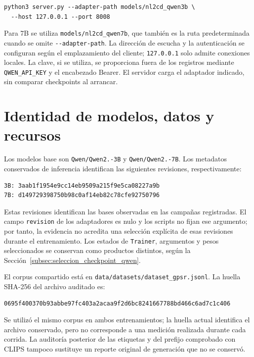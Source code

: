 {\small
\begin{verbatim}
python3 server.py --adapter-path models/nl2cd_qwen3b \
  --host 127.0.0.1 --port 8008
\end{verbatim}
}

Para 7B se utiliza \texttt{models/\allowbreak nl2cd\_\allowbreak qwen7b}, que también es la
ruta predeterminada cuando se omite \texttt{-\allowbreak -\allowbreak adapter-\allowbreak path}.
La dirección de escucha y la autenticación se configuran según el
emplazamiento del cliente; \texttt{127.0.0.1} solo admite conexiones
locales. La clave, si se utiliza, se proporciona fuera de los registros
mediante \texttt{QWEN\_API\_KEY} y el encabezado Bearer.
El servidor carga el adaptador indicado, sin comparar checkpoints al arrancar.



\section{Identidad de modelos, datos y recursos}
\label{app:identidad}

Los modelos base son \texttt{Qwen/\allowbreak Qwen2.-\allowbreak 3B} y
\texttt{Qwen/\allowbreak Qwen2.\allowbreak 5-\allowbreak 7B}. Los metadatos conservados de inferencia
identifican las siguientes revisiones, respectivamente:

{\scriptsize
\begin{verbatim}
3B: 3aab1f1954e9cc14eb9509a215f9e5ca08227a9b
7B: d149729398750b98c0af14eb82c78cfe92750796
\end{verbatim}
}

Estas revisiones identifican las bases observadas en las campañas
registradas. El campo \texttt{revision} de los adaptadores es nulo y
los scripts no fijan ese argumento; por tanto, la evidencia no acredita
una selección explícita de esas revisiones durante el entrenamiento.
Los estados de \texttt{Trainer}, argumentos y pesos seleccionados se
conservan como productos distintos, según la
Sección~\ref{subsec:seleccion_checkpoint_qwen}.

El corpus compartido está en \texttt{data/\allowbreak datasets/\allowbreak dataset\_\allowbreak gpsr.\allowbreak jsonl}.
La huella SHA-256 del archivo auditado es:

{\scriptsize
\begin{verbatim}
0695f400370b93abbe97fc403a2acaa9f2d6bc8241667788bd466c6ad7c1c406
\end{verbatim}
}

Se utilizó el mismo corpus en ambos entrenamientos; la huella actual
identifica el archivo conservado, pero no corresponde a una medición
realizada durante cada corrida. La auditoría posterior de las
etiquetas y del prefijo comprobado con CLIPS tampoco sustituye un reporte
original de generación que no se conservó.

